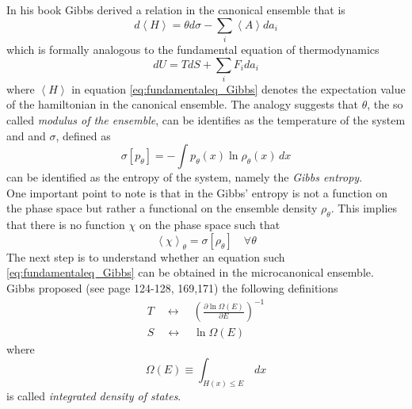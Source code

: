 In his book \cite{gibbs_2010} Gibbs derived a relation in the canonical ensemble that is
\begin{equation}
    d\left\langle H \right\rangle = \theta d\sigma - \sum_i \left\langle A \right\rangle da_i
    \label{eq:fundamentaleq_Gibbs}
\end{equation}
which is formally analogous to the fundamental equation of thermodynamics
\begin{equation*}
    dU = TdS + \sum_i F_i da_i
\end{equation*}
where $\left\langle H \right\rangle$ in equation \ref{eq:fundamentaleq_Gibbs} denotes the expectation value of the hamiltonian in the canonical ensemble.
The analogy suggests that $\theta$, the so called \emph{modulus of the ensemble}, can be identifies as the temperature of the system and  and $\sigma$, defined as
\begin{equation*}
    \sigma[p_{\theta}] = - \int p_{\theta}(x) \ln \rho_{\theta}(x) \, dx 
\end{equation*}
can be identified as the entropy of the system, namely the \emph{Gibbs entropy}. \\
One important point to note is that in the Gibbs' entropy is not a function on the phase space but rather a functional on the ensemble density $\rho_{\theta}$. This implies that there is no function $\chi$ on the phase space such that 
\begin{equation*}
    \left\langle \chi \right\rangle_{\theta} = \sigma[\rho_{\theta}] \quad \forall \theta
\end{equation*}
The next step is to understand whether an equation such \ref{eq:fundamentaleq_Gibbs} can be obtained in the microcanonical ensemble. Gibbs proposed (see \cite{gibbs_2010} page 124-128, 169,171) the following definitions
\begin{gather*}
    T \quad \longleftrightarrow \quad \left(\frac{\partial \ln \Omega(E)}{\partial E}\right)^{-1} \\
    S \quad \longleftrightarrow \quad \ln \Omega(E)
\end{gather*}
where 
\begin{equation*}
    \Omega(E) \equiv \int_{H(x) \leq E} \, dx
\end{equation*}
is called \emph{integrated density of states}. 